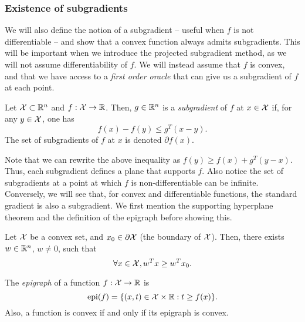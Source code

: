 \subsubsection{Existence of subgradients}
We will also define the notion of a subgradient -- useful when $f$ is not differentiable -- and show that a convex function always admits subgradients. This will be important when we introduce the projected subgradient method, as we will not assume differentiability of $f$. We will instead assume that $f$ is convex, and that we have access to a \emph{first order oracle} that can give us a subgradient of $f$ at each point.

\begin{definition}[Subgradient]
Let $\mathcal{X} \subset \mathbb{R}^n$ and $f : \mathcal{X} \rightarrow \mathbb{R}$. Then, $g \in \mathbb{R}^n$ is a \emph{subgradient} of $f$ at $x \in \mathcal{X}$ if, for any $y \in \mathcal{X}$, one has
\[
f(x) - f(y) \leq g^T (x - y).
\]
The set of subgradients of $f$ at $x$ is denoted $\partial f(x)$.
\end{definition} 

Note that we can rewrite the above inequality as $f(y) \geq f(x) + g^T (y - x)$. Thus, each subgradient defines a plane that supports $f$. Also notice the set of subgradients at a point at which $f$ is non-differentiable can be infinite. Conversely, we will see that, for convex and differentiable functions, the standard gradient is also a subgradient. We first mention the supporting hyperplane theorem and the definition of the epigraph before showing this.

\begin{theorem}
Let $\mathcal{X}$ be a convex set, and $x_0 \in \partial \mathcal{X}$ (the boundary of $\mathcal{X}$). Then, there exists $w \in \mathbb{R}^n$, $w \neq 0$, such that
\[
\forall x \in \mathcal{X}, w^T x \geq w^T x_0.
\]
\end{theorem}

\begin{definition}[Epigraph]
The \emph{epigraph} of a function $f : \mathcal{X} \rightarrow \mathbb{R}$ is
\[
\mbox{epi}(f) = \{(x, t) \in \mathcal{X} \times \mathbb{R}: t \geq f(x)\}.
\]
Also, a function is convex if and only if its epigraph is convex.
\end{definition}

